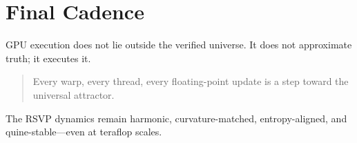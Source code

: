 \section{Final Cadence}

GPU execution does not lie outside the verified universe.  
It does not approximate truth; it executes it.

\begin{quote}
Every warp, every thread, every floating-point update  
is a step toward the universal attractor.
\end{quote}

The RSVP dynamics remain harmonic, curvature-matched, entropy-aligned, and quine-stable---even at teraflop scales.
